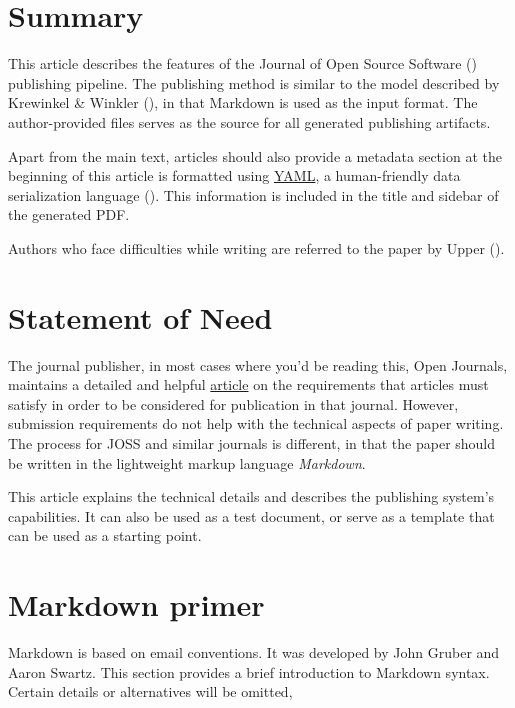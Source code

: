 \documentclass[10pt,a4paper,onecolumn]{article}
\begin{document}
\section{Summary}\label{summary}

This article describes the features of the Journal of Open Source
Software () publishing
pipeline. The publishing method is similar to the model described by
Krewinkel \& Winkler (), in that
Markdown is used as the input format. The author-provided files serves
as the source for all generated publishing artifacts.

Apart from the main text, articles should also provide a metadata
section at the beginning of this article is formatted using
\href{https://yaml.org}{YAML}, a human-friendly data serialization
language (). This information is included in the title and sidebar of
the generated PDF.

Authors who face difficulties while writing are referred to the paper by
Upper ().

\section{Statement of Need}\label{statement-of-need}

The journal publisher, in most cases where you'd be reading this, Open
Journals, maintains a detailed and helpful
\href{https://joss.readthedocs.io/en/latest/submitting.html}{article} on
the requirements that articles must satisfy in order to be considered
for publication in that journal. However, submission requirements do not
help with the technical aspects of paper writing. The process for JOSS
and similar journals is different, in that the paper should be written
in the lightweight markup language \emph{Markdown}.

This article explains the technical details and describes the publishing
system's capabilities. It can also be used as a test document, or serve
as a template that can be used as a starting point.

\section{Markdown primer}\label{markdown-primer}

Markdown is based on email conventions. It was developed by John Gruber
and Aaron Swartz. This section provides a brief introduction to Markdown
syntax. Certain details or alternatives will be omitted,
\end{document}
